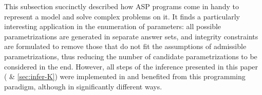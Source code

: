 \begin{comment}
We rely on integrity constraints to filter only admissible parametrizations.
An integrity constraint is a rule with no head, that makes an answer set unsatisfiable if its body turns out to be true.
Hence, if we suppose that:
\begin{itemize}
  \item the $\atom{less\_active}(a, p, q)$ atom means that $K^p_{a,\omega}$ stands for a configuration with less activating regulators than $K^q_{a,\omega'}$, %
  \item the $\atom{param\_inf}(a, p, q)$ atom means: $K^p_{a,\omega} \leqsegm K^q_{a,\omega'}$,
\end{itemize}
then the monotonicity assumption (\pref{pro:param_enum_monotonicity}) is formulated as the following integrity constraint:
$$\la \atom{less\_active}(\var{X}, \var{P}, \var{Q}), \nota \atom{param\_inf}(\var{X}, \var{P}, \var{Q}).$$
which removes all parametrization results where parameters $K^\var{P}_{\var{X},\omega}$ and $K^\var{Q}_{\var{X},\omega'}$ exist such that $\var{X}$ is less activated by $\omega$ than $\omega'$ %
but $K^\var{Q}_{\var{X},\omega'} \ltsegm K^\var{P}_{\var{X},\omega}$,
thus violating the monotonicity assumption.
Of course, other assumptions can be formulated in the same way.
\end{comment}



\medskip

This subsection succinctly described how ASP programs come in handy to represent a model and solve complex problems on it.
It finds a particularly interesting application in the enumeration of parameters:
all possible parametrizations are generated in separate answer sets,
and integrity constraints are formulated to remove those that do not fit the assumptions of admissible parametrizations,
thus reducing the number of candidate parametrizations to be considered in the end.
However, all steps of the inference presented in this paper ( \& \ref{sec:infer-K})
were implemented in and benefited from this programming paradigm, although in significantly different ways.
